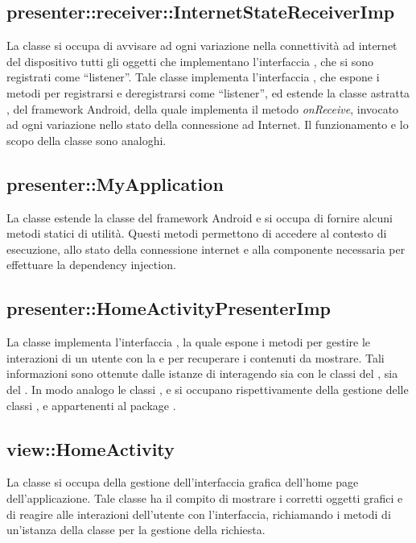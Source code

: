 \documentclass[../Tesi.tex]{subfiles}
\begin{document}
		\subsection{presenter::receiver::InternetStateReceiverImp}
		La classe  si occupa di avvisare ad ogni variazione nella connettività ad internet del dispositivo tutti gli oggetti che implementano l'interfaccia , che si sono registrati come ``listener''. Tale classe implementa l'interfaccia , che espone i metodi per registrarsi e deregistrarsi come ``listener'', ed estende la classe astratta , del framework Android, della quale implementa il metodo \textit{onReceive}, invocato ad ogni variazione nello stato della connessione ad Internet. Il funzionamento e lo scopo della classe  sono analoghi. 

		\subsection{presenter::MyApplication}
		La classe  estende la classe  del framework Android e si occupa di fornire alcuni metodi statici di utilità. Questi metodi permettono di accedere al contesto di esecuzione, allo stato della connessione internet e alla componente necessaria per effettuare la dependency injection.

		\subsection{presenter::HomeActivityPresenterImp}
		La classe  implementa l'interfaccia , la quale espone i metodi per gestire le interazioni di un utente con la  e per recuperare i contenuti da mostrare. Tali informazioni sono ottenute dalle istanze di  interagendo sia con le classi del , sia del . In modo analogo le classi ,  e  si occupano rispettivamente della gestione delle classi ,  e  appartenenti al package .

		\subsection{view::HomeActivity}
		La classe  si occupa della gestione dell'interfaccia grafica dell'home page dell'applicazione. Tale classe ha il compito di mostrare i corretti oggetti grafici e di reagire alle interazioni dell'utente con l'interfaccia, richiamando i metodi di un'istanza della classe  per la gestione della richiesta.
\end{document}
